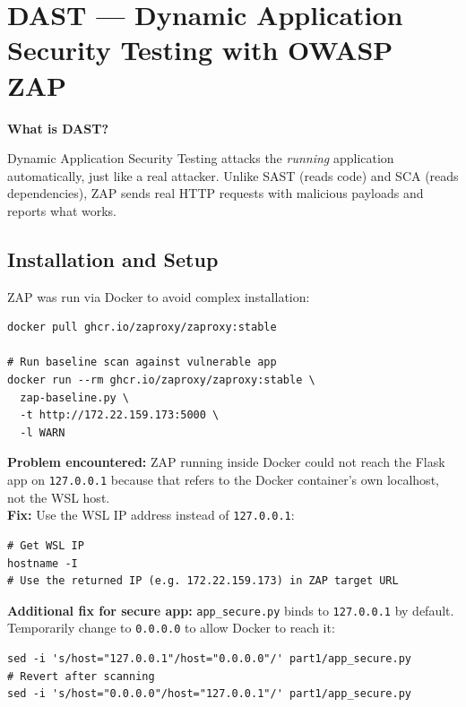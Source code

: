 \documentclass[12pt,a4paper]{report}
\begin{document}
\section{DAST — Dynamic Application Security Testing with OWASP ZAP}

\textbf{What is DAST?}

Dynamic Application Security Testing attacks the \textit{running} application automatically, just like a real attacker. Unlike SAST (reads code) and SCA (reads dependencies), ZAP sends real HTTP requests with malicious payloads and reports what works.

\subsection{Installation and Setup}

ZAP was run via Docker to avoid complex installation:

\begin{lstlisting}[style=bashstyle, caption={Pulling and running OWASP ZAP}]
docker pull ghcr.io/zaproxy/zaproxy:stable

# Run baseline scan against vulnerable app
docker run --rm ghcr.io/zaproxy/zaproxy:stable \
  zap-baseline.py \
  -t http://172.22.159.173:5000 \
  -l WARN
\end{lstlisting}

\begin{warningbox}
\textbf{Problem encountered:} ZAP running inside Docker could not reach the Flask app on \texttt{127.0.0.1} because that refers to the Docker container's own localhost, not the WSL host.\\[4pt]
\textbf{Fix:} Use the WSL IP address instead of \texttt{127.0.0.1}:
\begin{lstlisting}[style=bashstyle]
# Get WSL IP
hostname -I
# Use the returned IP (e.g. 172.22.159.173) in ZAP target URL
\end{lstlisting}
\textbf{Additional fix for secure app:} \texttt{app\_secure.py} binds to \texttt{127.0.0.1} by default. Temporarily change to \texttt{0.0.0.0} to allow Docker to reach it:
\begin{lstlisting}[style=bashstyle]
sed -i 's/host="127.0.0.1"/host="0.0.0.0"/' part1/app_secure.py
# Revert after scanning
sed -i 's/host="0.0.0.0"/host="127.0.0.1"/' part1/app_secure.py
\end{lstlisting}
\end{warningbox}
\end{document}
